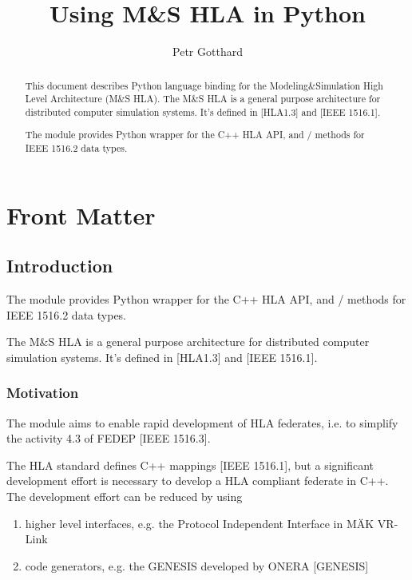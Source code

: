 \documentclass[12pt,a4paper]{howto}
\title{Using M\&S HLA in Python}
\author{Petr Gotthard}
\begin{document}
\maketitle

%
\ifhtml
\chapter*{Front Matter\label{front}}
\fi


\begin{abstract}
\noindent
This document describes Python language binding for the Modeling\&Simulation
High Level Architecture (M\&S HLA).
The M\&S HLA is a general purpose architecture for distributed computer
simulation systems. It's defined in [HLA1.3] and [IEEE 1516.1].

The  module provides Python wrapper for the C++ HLA API, and
/ methods for IEEE 1516.2 data types.
\end{abstract}

\tableofcontents

\section{Introduction}

The  module provides Python wrapper for the C++ HLA API, and
/ methods for IEEE 1516.2 data types.

The M\&S HLA is a general purpose architecture for distributed computer
simulation systems. It's defined in [HLA1.3] and [IEEE 1516.1].

\subsection{Motivation}

The  module aims to enable rapid development of HLA federates,
i.e. to simplify the activity 4.3 of FEDEP [IEEE 1516.3].

The HLA standard defines C++ mappings [IEEE 1516.1], but a significant
development effort is necessary to develop a HLA compliant federate in C++.
The development effort can be reduced by using
\begin{enumerate}
\item higher level interfaces, e.g. the Protocol Independent Interface in M\"{A}K VR-Link
\item code generators, e.g. the GENESIS developed by ONERA [GENESIS]
\end{enumerate}
\end{document}
